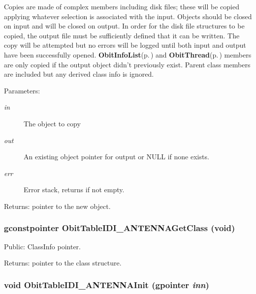 Copies are made of complex members including disk files; these will be copied applying whatever selection is associated with the input. Objects should be closed on input and will be closed on output. In order for the disk file structures to be copied, the output file must be sufficiently defined that it can be written. The copy will be attempted but no errors will be logged until both input and output have been successfully opened. {\bf Obit\-Info\-List}{\rm (p.\,\pageref{structObitInfoList})} and {\bf Obit\-Thread}{\rm (p.\,\pageref{structObitThread})} members are only copied if the output object didn't previously exist. Parent class members are included but any derived class info is ignored. \begin{Desc}
\item[Parameters:]
\begin{description}
\item[{\em in}]The object to copy \item[{\em out}]An existing object pointer for output or NULL if none exists. \item[{\em err}]Error stack, returns if not empty. \end{description}
\end{Desc}
\begin{Desc}
\item[Returns:]pointer to the new object. \end{Desc}
\subsubsection{\setlength{\rightskip}{0pt plus 5cm}gconstpointer Obit\-Table\-IDI\_\-ANTENNAGet\-Class (void)}\label{ObitTableIDI__ANTENNA_8c_a17}


Public: Class\-Info pointer. 

\begin{Desc}
\item[Returns:]pointer to the class structure. \end{Desc}
\subsubsection{\setlength{\rightskip}{0pt plus 5cm}void Obit\-Table\-IDI\_\-ANTENNAInit (gpointer {\em inn})}\label{ObitTableIDI__ANTENNA_8c_a8}


